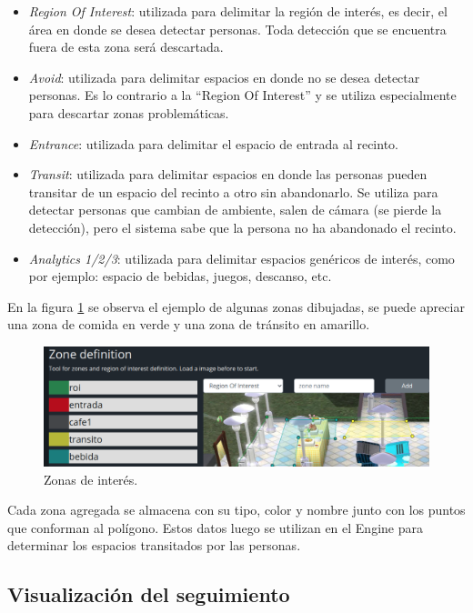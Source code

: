 \begin{itemize}
\item \textit{Region Of Interest}: utilizada para delimitar la región de interés, es decir, el área en donde se desea detectar personas. Toda detección que se encuentra fuera de esta zona será descartada.
\item \textit{Avoid}: utilizada para delimitar espacios en donde no se desea detectar personas. Es lo contrario a la ``Region Of Interest'' y se utiliza especialmente para descartar zonas problemáticas.
\item \textit{Entrance}: utilizada para delimitar el espacio de entrada al recinto.
\item \textit{Transit}: utilizada para delimitar espacios en donde las personas pueden transitar de un espacio del recinto a otro sin abandonarlo. Se utiliza para detectar personas que cambian de ambiente, salen de cámara (se pierde la detección), pero el sistema sabe que la persona no ha abandonado el recinto.
\item \textit{Analytics 1/2/3}: utilizada para delimitar espacios genéricos de interés, como por ejemplo: espacio de bebidas, juegos, descanso, etc.
\end{itemize}

En la figura \ref{fig:visualizacionZonas} se observa el ejemplo de algunas zonas dibujadas, se puede apreciar una zona de comida en verde y una zona de tránsito en amarillo.

\begin{figure}[ht]
	\centering
	\includegraphics[scale=.5]{./Figures/visualizacionZonas.png}
	\caption{Zonas de interés.}
	\label{fig:visualizacionZonas}
\end{figure}

Cada zona agregada se almacena con su tipo, color y nombre junto con los puntos que conforman al polígono. Estos datos luego se utilizan en el Engine para determinar los espacios transitados por las personas.

\newpage

\subsection{Visualización del seguimiento}

